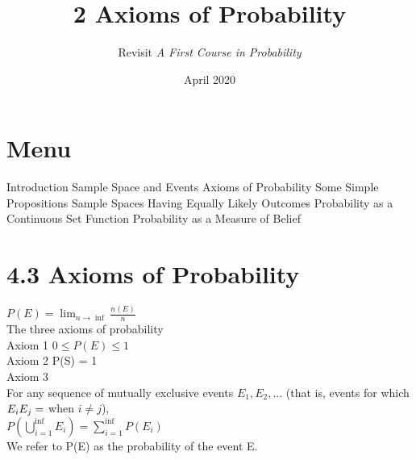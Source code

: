 \documentclass{article}
\title{2 Axioms of Probability}
\author{Revisit \emph{A First Course in Probability}}
\date{April 2020}
\begin{document}
\maketitle

\section*{Menu}
\begin{outline}[enumerate]
    \1  Introduction 
    \1  Sample Space and Events 
    \1  Axioms of Probability 
    \1  Some Simple Propositions  
    \1  Sample Spaces Having Equally Likely Outcomes 
    \1  Probability as a Continuous Set Function 
    \1  Probability as a Measure of Belief
\end{outline}


\section*{4.3 Axioms of Probability}
$P(E) = \lim_{n \rightarrow \inf} \frac{n(E)}{n}$\\
The three axioms of probability \\
Axiom 1 $0 \leq P(E) \leq 1$\\
Axiom 2 P(S) = 1 \\
Axiom 3 \\
For any sequence of mutually exclusive events $E_1, E_2, ...$ (that is, events for which $E_i E_j=\empty$ when $i \neq j$), \\
$P(\bigcup_{i=1}^{\inf}E_i) = \sum_{i=1}^{\inf}P(E_i)$\\
We refer to P(E) as the probability of the event E. 







\end{document}
